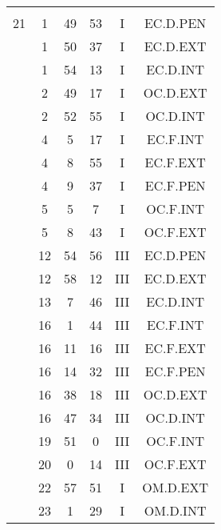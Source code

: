 \documentclass[12pt, a4paper]{article}
\begin{document}
\begin{multicols}{3}
{\begin{tabular}{c c c c c c}
	 	 	 	 & & & & & \\%
	 	 	 	21 & 1 & 49 & 53 & I & EC.D.PEN\\%
	 	 	 	 & 1 & 50 & 37 & I & EC.D.EXT\\%
	 	 	 	 & 1 & 54 & 13 & I & EC.D.INT\\%
	 	 	 	 & 2 & 49 & 17 & I & OC.D.EXT\\%
	 	 	 	 & 2 & 52 & 55 & I & OC.D.INT\\%
	 	 	 	 & 4 & 5 & 17 & I & EC.F.INT\\%
	 	 	 	 & 4 & 8 & 55 & I & EC.F.EXT\\%
	 	 	 	 & 4 & 9 & 37 & I & EC.F.PEN\\%
	 	 	 	 & 5 & 5 & 7 & I & OC.F.INT\\%
	 	 	 	 & 5 & 8 & 43 & I & OC.F.EXT\\%
	 	 	 	 & 12 & 54 & 56 & III & EC.D.PEN\\%
	 	 	 	 & 12 & 58 & 12 & III & EC.D.EXT\\%
	 	 	 	 & 13 & 7 & 46 & III & EC.D.INT\\%
	 	 	 	 & 16 & 1 & 44 & III & EC.F.INT\\%
	 	 	 	 & 16 & 11 & 16 & III & EC.F.EXT\\%
	 	 	 	 & 16 & 14 & 32 & III & EC.F.PEN\\%
	 	 	 	 & 16 & 38 & 18 & III & OC.D.EXT\\%
	 	 	 	 & 16 & 47 & 34 & III & OC.D.INT\\%
	 	 	 	 & 19 & 51 & 0 & III & OC.F.INT\\%
	 	 	 	 & 20 & 0 & 14 & III & OC.F.EXT\\%
	 	 	 	 & 22 & 57 & 51 & I & OM.D.EXT\\%
	 	 	 	 & 23 & 1 & 29 & I & OM.D.INT\\%

\end{tabular}}
\end{multicols}
\end{document}
